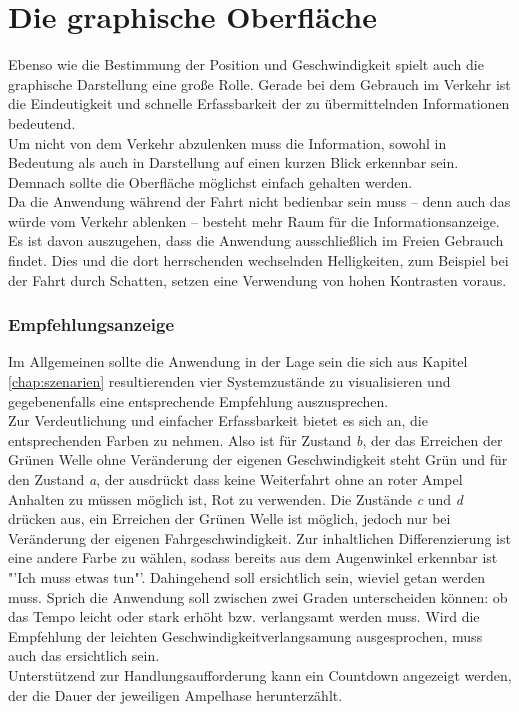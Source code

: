 \section{Die graphische Oberfläche}
Ebenso wie die Bestimmung der Position und Geschwindigkeit spielt auch die graphische Darstellung eine große Rolle. Gerade bei dem Gebrauch im Verkehr ist die Eindeutigkeit und schnelle Erfassbarkeit der zu übermittelnden Informationen bedeutend.  \\
Um nicht von dem Verkehr abzulenken muss die Information, sowohl in Bedeutung als auch in Darstellung auf einen kurzen Blick erkennbar sein. Demnach sollte die Oberfläche möglichst einfach gehalten werden.\\
Da die Anwendung während der Fahrt nicht bedienbar sein muss -- denn auch das würde vom Verkehr ablenken -- besteht mehr Raum für die Informationsanzeige. 
Es ist davon auszugehen, dass die Anwendung ausschließlich im Freien Gebrauch findet. Dies und die dort herrschenden wechselnden Helligkeiten, zum Beispiel bei der Fahrt durch Schatten, setzen eine Verwendung von hohen Kontrasten voraus.
\subsubsection{Empfehlungsanzeige}
Im Allgemeinen sollte die Anwendung in der Lage sein die sich aus Kapitel \ref{chap:szenarien} resultierenden vier Systemzustände zu visualisieren und gegebenenfalls eine entsprechende Empfehlung auszusprechen.\\
Zur Verdeutlichung und einfacher Erfassbarkeit bietet es sich an, die entsprechenden Farben zu nehmen. Also ist für Zustand \textit{b}, der das Erreichen der Grünen Welle ohne Veränderung der eigenen Geschwindigkeit steht Grün und für den Zustand \textit{a}, der ausdrückt dass keine Weiterfahrt ohne an roter Ampel Anhalten zu müssen möglich ist, Rot zu verwenden.
Die Zustände \textit{c} und \textit{d} drücken aus, ein Erreichen der Grünen Welle ist möglich, jedoch nur bei Veränderung der eigenen Fahrgeschwindigkeit. Zur inhaltlichen Differenzierung ist eine andere Farbe zu wählen, sodass bereits aus dem Augenwinkel erkennbar ist "'Ich muss etwas tun"'. Dahingehend soll ersichtlich sein, wieviel getan werden muss. Sprich die Anwendung soll zwischen zwei Graden unterscheiden können: ob das Tempo leicht oder stark erhöht bzw. verlangsamt werden muss. Wird die Empfehlung der leichten Geschwindigkeitverlangsamung ausgesprochen, muss auch das ersichtlich sein.\\
Unterstützend zur Handlungsaufforderung kann ein Countdown angezeigt werden, der die Dauer der jeweiligen Ampelhase herunterzählt. 
